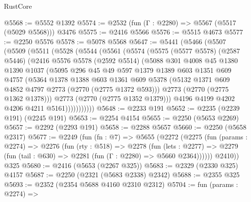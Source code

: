 \begin{lexlean}{RustCore}
\begin{coremodule}
@5568 := @5552 @1392
@5574 := @2532 (fun (Γ : @2280) => @5567 (@5517 (@5029 @5568))) @3476
@5575 := @2416 @5566
@5576 := @5515 @4673
@5577 := @2250 @5576
@5578 := @5078 @5568
@5647 := @5441
    (@5466
      (@5507
        (@5509
          (@5511
            (@5528
              (@5544
                (@5561
                  (@5574
                    (@5575
                      (@5577 @5578)
                      (@2587 @5446)
                      (@2416
                        @5576
                        @5578
                        (@2592 @5514)
                        (@5088
                          @301
                          @4008
                          @45
                          @1380
                          @1390
                          @1037
                          (@5095
                            @296
                            @45
                            @49
                            @597
                            @1379
                            @1389
                            @603
                            @1351
                            @609
                            @4757
                            (@5364
                              @1378
                              @1388
                              @603
                              @1361
                              @609
                              @5378
                              (@5132 @1371 @609 @4852 @4797 @2773 (@2770 (@2775 @1372 @593)))
                              @2773
                              (@2770 (@2775 @1362 @1378)))
                            @2773
                            (@2770 (@2775 @1352 @1379)))
                          @4196
                          @4199
                          @4202
                          @4206
                          @4211
                          @5161)))))))))))
@5648 := @2233 @191
@5652 := @2235 (@2239 @191) (@2245 @191)
@5653 := @2254 @4154
@5655 := @2250 (@5653 @2269)
@5657 := @2292 (@2293 @191)
@5658 := @2288 @5657
@5660 := @2250 (@5658 @2317)
@5677 := @2249
    (fun (fn : @7) =>
    @5655
      (@2272
        (@2275
          (fun (params : @2274) =>
          @2276
            (fun (rty : @518) =>
            @2278
              (fun (lets : @2277) =>
              @2279 (fun (tail : @630) => @2281 (fun (Γ : @2280) => @5660 @2364))))))
        @2410))
    @325
@5680 := @2416 (@5653 (@2267 @325))
@5683 := @2329 (@2330 @325) @4157
@5687 := @2250 (@2321 (@5683 @2338) @2342)
@5688 := @2355 @325
@5693 := @2352 (@2354 @5688 @4160 @2310 @2312)
@5704 := fun (params : @2274) =>

\end{coremodule}
\end{lexlean}
